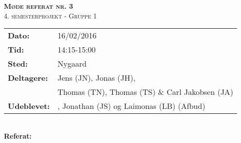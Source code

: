 
\newcommand{\HRule}{\rule{\linewidth}{0.1mm}}


	\begin{center}
		{\huge \bfseries \textsc{Møde referat nr. 3}}\\
		\textsc{\large 4. semesterprojekt - Gruppe 1}\\[0.3cm]
	\end{center}
	\begin{tabular}{ll}
	\large \textbf{Dato:} & 16/02/2016  \\ %
	\large \textbf{Tid:}  & 14:15-15:00 \\ %
	\large \textbf{Sted:} & Nygaard		\\ %
	\large \textbf{Deltagere:} & Jens (JN), Jonas (JH), \\
	\large \textbf & Thomas (TN),  Thomas (TS) \& Carl Jakobsen (JA)\\
	\large \textbf{Udeblevet:} & , Jonathan (JS) og Laimonas (LB) (Afbud)	\\
	\end{tabular}\\
	\phantom{\,}\hspace{0.1em} \large \textbf{Referat:}
